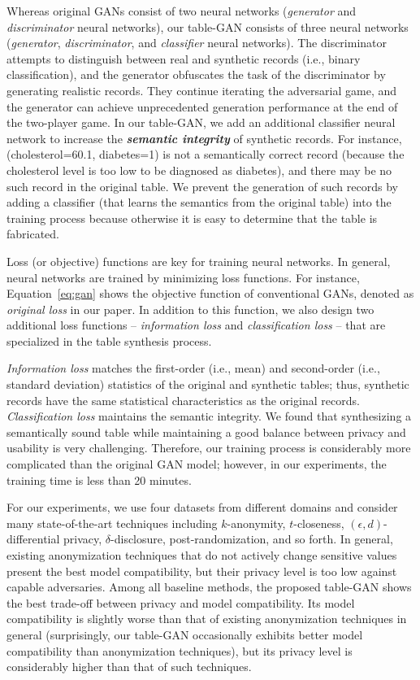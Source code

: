 Whereas original GANs consist of two neural networks (\textit{generator} and \textit{discriminator} neural networks), our table-GAN consists of three neural networks (\textit{generator}, \textit{discriminator}, and \textit{classifier} neural networks). The discriminator attempts to distinguish between real and synthetic records (i.e., binary classification), and the generator obfuscates the task of the discriminator by generating realistic records. They continue iterating the adversarial game, and the generator can achieve unprecedented generation performance at the end of the two-player game. In our table-GAN, we add an additional classifier neural network to increase the \textbf{\textit{semantic integrity}} of synthetic records. For instance, (cholesterol=60.1, diabetes=1) is not a semantically correct record (because the cholesterol level is too low to be diagnosed as diabetes), and there may be no such record in the original table. We prevent the generation of such records by adding a classifier (that learns the semantics from the original table) into the training process because  otherwise it is easy to determine that the table is fabricated.

Loss (or objective) functions are key for training neural networks. In general, neural networks are trained by minimizing loss functions. For instance, Equation~\eqref{eq:gan} shows the objective function of conventional GANs, denoted as \textit{original loss} in our paper. In addition to this function, we also design two additional loss functions -- \textit{information loss} and \textit{classification loss} -- that are specialized in the table synthesis process.

\textit{Information loss} matches the first-order (i.e., mean) and second-order (i.e., standard deviation) statistics of the original and synthetic tables; thus, synthetic records have the same statistical characteristics as the original records. \textit{Classification loss} maintains the semantic integrity. We found that synthesizing a semantically sound table while maintaining a good balance between privacy and usability is very challenging. Therefore, our training process is considerably more complicated than the original GAN model; however, in our experiments, the training time is less than 20 minutes.

For our experiments, we use four datasets from different domains and consider many state-of-the-art techniques including $k$-anonymity, $t$-closeness, $(\epsilon,d)$-differential privacy, $\delta$-disclosure, post-randomization, and so forth. In general, existing anonymization techniques that do not actively change sensitive values present the best model compatibility, but their privacy level is too low against capable adversaries. Among all baseline methods, the proposed table-GAN shows the best trade-off between privacy and model compatibility. Its model compatibility is slightly worse than that of existing anonymization techniques in general (surprisingly, our table-GAN occasionally exhibits better model compatibility than anonymization techniques), but its privacy level is considerably higher than that of such techniques.

